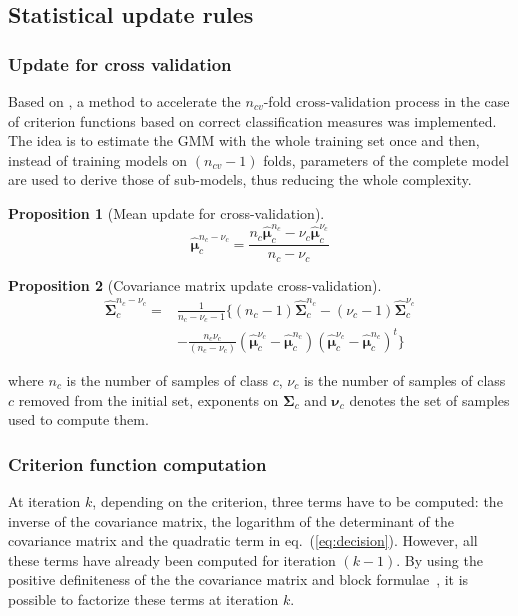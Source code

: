 \documentclass[journal,peerreview,onecolumn]{IEEEtran}
\newtheorem{prop}{Proposition}
\begin{document}
\subsection{Statistical update rules}
        \subsubsection{Update for cross validation}
        \label{sec:update-cv}
        Based on \cite{fauvel2015fast}, a method to accelerate the $n_{cv}$-fold cross-validation process in the case of criterion functions based on correct classification measures was implemented. The idea is to estimate the GMM with the whole training set once and then, instead of training models on $(n_{cv}-1)$ folds, parameters of the complete model are used to derive those of sub-models, thus reducing the whole complexity.

        \begin{prop}[Mean update for cross-validation]
            \label{eq:update-cv1}
            \begin{equation*}
                \boldsymbol{\hat{\mu}}_c^{n_c-\nu_c} = \frac{n_c \boldsymbol{\hat{\mu}}_c^{n_c} - \nu_c \boldsymbol{\hat{\mu}}_c^{\nu_c}}{n_c - \nu_c} \nonumber
            \end{equation*}
        \end{prop}
        \begin{prop}[Covariance matrix update cross-validation]
            \label{eq:update-cv2}
            \begin{align*}
              \boldsymbol{\hat{\Sigma}}_c^{n_c-\nu_c} = &\frac{1}{n_c-\nu_c-1} \biggl\{ (n_c-1) \boldsymbol{\hat{\Sigma}}_c^{n_c} - (\nu_c-1)\boldsymbol{\hat{\Sigma}}_c^{\nu_c} \nonumber \\
                                                        &- \frac{n_c \nu_c}{(n_c-\nu_c)} (\boldsymbol{\hat{\mu}}_c^{\nu_c}-\boldsymbol{\hat{\mu}}_c^{n_c})(\boldsymbol{\hat{\mu}}_c^{\nu_c}-\boldsymbol{\hat{\mu}}_c^{n_c})^t \biggr\} \nonumber
            \end{align*}
        \end{prop}
        \noindent where $n_c$ is the number of samples of class $c$, $\nu_c$ is the number of samples of class $c$ removed from the initial set, exponents on $\boldsymbol{\Sigma}_c$ and $\boldsymbol{\nu}_c$ denotes the set of samples used to compute them.

        \subsubsection{Criterion function computation}
        \label{sec:update-crit}
        At iteration $k$, depending on the criterion, three terms have
        to  be computed:  the inverse  of the  covariance matrix,  the
        logarithm of the determinant of  the covariance matrix and the
        quadratic term in  eq.~(\ref{eq:decision}). However, all these
        terms  have already  been computed  for iteration  $(k-1)$. By
        using the  positive definiteness of the  the covariance matrix
        and block formulae~\cite[Chapter 9.2]{webb2003statistical}, it
        is possible to factorize these terms at iteration $k$.
\end{document}
